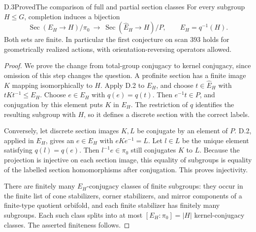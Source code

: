 \begin{claim}{D.3}{Proved}{The comparison of full and partial section classes}
For every subgroup $H\leq G$, completion induces a bijection
\[
\operatorname{Sec}(E_H\to H)/\pi_0
\ \longrightarrow\
\operatorname{Sec}(\widehat E_H\to H)/P,
\qquad E_H=q^{-1}(H).
\]
Both sets are finite. In particular the first conjecture on scan 393 holds for geometrically realized actions, with orientation-reversing operators allowed.
\end{claim}
\begin{proof}
We prove the change from total-group conjugacy to kernel conjugacy, since omission of this step changes the question. A profinite section has a finite image $K$ mapping isomorphically to $H$. Apply D.2 to $E_H$, and choose $t\in\widehat E_H$ with $tKt^{-1}\leq E_H$. Choose $e\in E_H$ with $q(e)=\widehat q(t)$. Then $e^{-1}t\in P$, and conjugation by this element puts $K$ in $E_H$. The restriction of $q$ identifies the resulting subgroup with $H$, so it defines a discrete section with the correct labels.

Conversely, let discrete section images $K,L$ be conjugate by an element of $P$. D.2, applied in $E_H$, gives an $e\in E_H$ with $eKe^{-1}=L$. Let $l\in L$ be the unique element satisfying $q(l)=q(e)$. Then $l^{-1}e\in\pi_0$ still conjugates $K$ to $L$. Because the projection is injective on each section image, this equality of subgroups is equality of the labelled section homomorphisms after conjugation. This proves injectivity.

There are finitely many $E_H$-conjugacy classes of finite subgroups: they occur in the finite list of cone stabilizers, corner stabilizers, and mirror components of a finite-type quotient orbifold, and each finite stabilizer has finitely many subgroups. Each such class splits into at most $[E_H:\pi_0]=|H|$ kernel-conjugacy classes. The asserted finiteness follows.
\end{proof}

